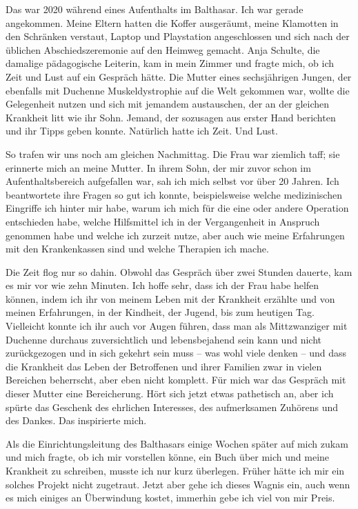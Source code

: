 \documentclass[fontsize=12pt,a4paper,headinclude,DIV=calc,automark]{scrbook}
\begin{document}
Das war 2020 während eines Aufenthalts im Balthasar. Ich war gerade angekommen. Meine Eltern hatten die Koffer ausgeräumt, meine Klamotten in den Schränken verstaut, Laptop und Playstation angeschlossen und sich nach der üblichen Abschiedszeremonie auf den Heimweg gemacht. Anja Schulte, die damalige pädagogische Leiterin, kam in mein Zimmer und fragte mich, ob ich Zeit und Lust auf ein Gespräch hätte. Die Mutter eines sechsjährigen Jungen, der ebenfalls mit Duchenne Muskeldystrophie auf die Welt gekommen war, wollte die Gelegenheit nutzen und sich mit jemandem austauschen, der an der gleichen Krankheit litt wie ihr Sohn. Jemand, der sozusagen aus erster Hand berichten und ihr Tipps geben konnte.
Natürlich hatte ich Zeit. Und Lust.

So trafen wir uns noch am gleichen Nachmittag. Die Frau war ziemlich taff; sie erinnerte mich an meine Mutter. In ihrem Sohn, der mir zuvor schon im Aufenthaltsbereich aufgefallen war, sah ich mich selbst vor über 20 Jahren. Ich beantwortete ihre Fragen so gut ich konnte, beispielsweise welche medizinischen Eingriffe ich hinter mir habe, warum ich mich für die eine oder andere Operation entschieden habe, welche Hilfsmittel ich in der Vergangenheit in Anspruch genommen habe und welche ich zurzeit nutze, aber auch wie meine Erfahrungen mit den Krankenkassen sind und welche Therapien ich mache.

Die Zeit flog nur so dahin. Obwohl das Gespräch über zwei Stunden dauerte, kam es mir vor wie zehn Minuten. Ich hoffe sehr, dass ich der Frau habe helfen können, indem ich ihr von meinem Leben mit der Krankheit erzählte und von meinen Erfahrungen, in der Kindheit, der Jugend, bis zum heutigen Tag. Vielleicht konnte ich ihr auch vor Augen führen, dass man als Mittzwanziger mit Duchenne durchaus zuversichtlich und lebensbejahend sein kann und nicht zurückgezogen und in sich gekehrt sein muss – was wohl viele denken – und dass die Krankheit das Leben der Betroffenen und ihrer Familien zwar in vielen Bereichen beherrscht, aber eben nicht komplett. Für mich war das Gespräch mit dieser Mutter eine Bereicherung. Hört sich jetzt etwas pathetisch an, aber ich spürte das Geschenk des ehrlichen Interesses, des aufmerksamen Zuhörens und des Dankes. Das inspirierte mich.

Als die Einrichtungsleitung des Balthasars einige Wochen später auf mich zukam und mich fragte, ob ich mir vorstellen könne, ein Buch über mich und meine Krankheit zu schreiben, musste ich nur kurz überlegen. Früher hätte ich mir ein solches Projekt nicht zugetraut. Jetzt aber gehe ich dieses Wagnis ein, auch wenn es mich einiges an Überwindung kostet, immerhin gebe ich viel von mir Preis.
\end{document}
